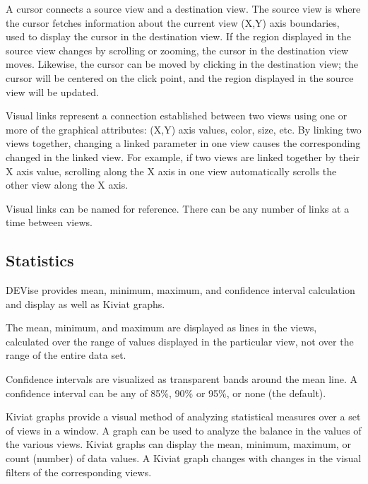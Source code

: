 A cursor connects a source view and a destination view. The source view is
where the cursor fetches information about the current view (X,Y) axis
boundaries, used to display the cursor in the destination view. If the region displayed in the source view changes by scrolling or zooming, the cursor in the destination view moves. Likewise, the cursor can be moved by clicking in the destination view; the cursor will be centered on the click point, and the region displayed in the source view will be updated.

Visual links represent a connection established between two views using one or
more of the graphical attributes: (X,Y) axis values, color, size, etc. By
linking two views together, changing a linked parameter in one view causes the
corresponding changed in the linked view. For example, if two views are linked
together by their X axis value, scrolling along the X axis in one view
automatically scrolls the other view along the X axis.

Visual links can be named for reference. There can be any number of links at a
time between views.


\subsection{Statistics}

DEVise provides mean, minimum, maximum, and confidence interval calculation and
display as well as Kiviat graphs.

The mean, minimum, and maximum are displayed as lines in the views, calculated
over the range of values displayed in the particular view, not over the range of
the entire data set.

Confidence intervals are visualized as transparent bands around the mean line. A
confidence interval can be any of 85\%, 90\% or 95\%, or none (the default).

Kiviat graphs provide a visual method of analyzing statistical measures over a
set of views in a window. A graph can be used to analyze the balance in the
values of the various views. Kiviat graphs can display the mean, minimum,
maximum, or count (number) of data values. A Kiviat graph changes with changes
in the visual filters of the corresponding views.


